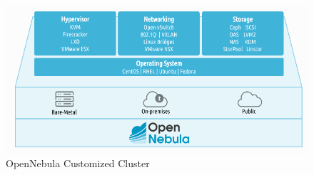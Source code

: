 \begin{figure}
    \centering
    \includegraphics*[scale=0.4]{graphics/main/overivew/chap1-customCluster.png}
    \caption{OpenNebula Customized Cluster}
    \label{fig:chap1-customCluster}
\end{figure}
